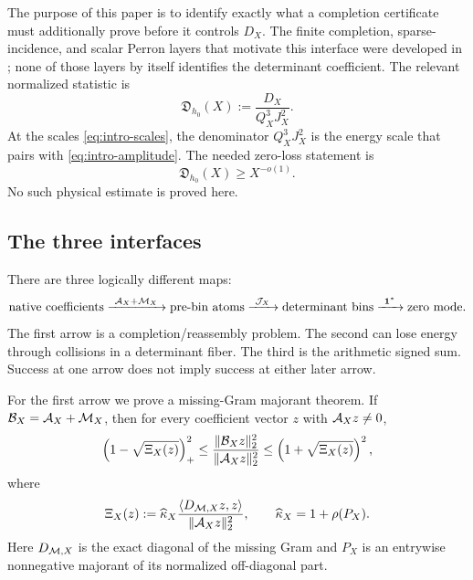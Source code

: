 The purpose of this paper is to identify exactly what a completion
certificate must additionally prove before it controls \(D_X\).  The
finite completion, sparse-incidence, and scalar Perron layers that
motivate this interface were developed in
\citep{WangTPC75,WangTPC77,WangTPC80}; none of those layers by itself
identifies the determinant coefficient.
The
relevant normalized statistic is
\begin{equation}
 \boxed{\displaystyle
 \mathfrak D_{h_0}(X)
 :=\frac{D_X}{Q_X^3J_X^2}.}
 \label{eq:intro-energy-statistic}
\end{equation}
At the scales \eqref{eq:intro-scales}, the denominator
\(Q_X^3J_X^2\) is the energy scale that pairs with
\eqref{eq:intro-amplitude}.  The needed zero-loss statement is
\begin{equation}
 \mathfrak D_{h_0}(X)\ge X^{-o(1)}.
 \label{eq:intro-energy-target}
\end{equation}
No such physical estimate is proved here.

\subsection{The three interfaces}

There are three logically different maps:
\[
 \text{native coefficients}
 \xrightarrow{\ \mathcal A_X+\mathcal M_X\ }
 \text{pre-bin atoms}
 \xrightarrow{\ \mathcal J_X\ }
 \text{determinant bins}
 \xrightarrow{\ \bm 1^*\ }
 \text{zero mode}.
\]
The first arrow is a completion/reassembly problem.  The second can
lose energy through collisions in a determinant fiber.  The third is
the arithmetic signed sum.  Success at one arrow does not imply
success at either later arrow.

For the first arrow we prove a missing-Gram majorant theorem.  If
\(\mathcal B_X=\mathcal A_X+\mathcal M_X\), then for every coefficient vector \(z\) with
\(\mathcal A_Xz\ne0\),
\begin{equation}
 \left(1-\sqrt{\Xi_X(z)}\right)_+^2
 \le
 \frac{\|\mathcal B_Xz\|_2^2}{\|\mathcal A_Xz\|_2^2}
 \le
 \left(1+\sqrt{\Xi_X(z)}\right)^2,
 \label{eq:intro-specific}
\end{equation}
where
\begin{equation}
 \Xi_X(z)
 :=
 \widehat\kappa_X
 \frac{\langle D_{\mathcal M,X}z,z\rangle}
      {\|\mathcal A_Xz\|_2^2},
 \qquad
 \widehat\kappa_X=1+\rho(P_X).
 \label{eq:intro-Xi}
\end{equation}
Here \(D_{\mathcal M,X}\) is the exact diagonal of the missing Gram and
\(P_X\) is an entrywise nonnegative majorant of its normalized
off-diagonal part.

